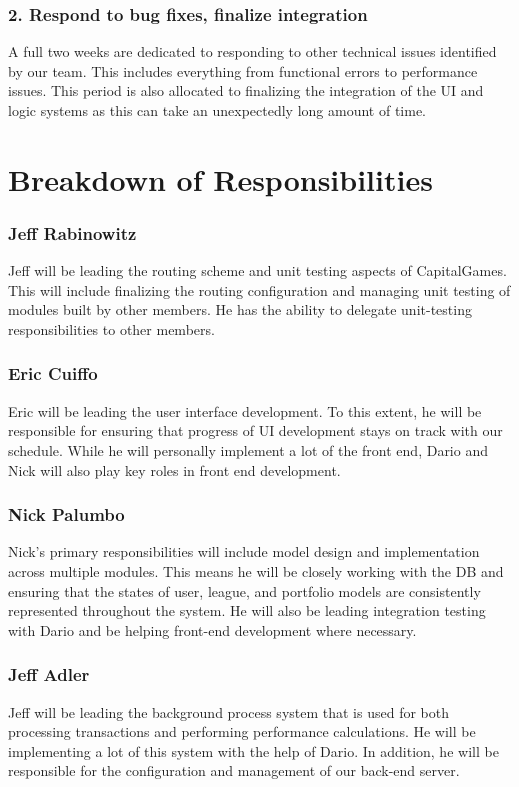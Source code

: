 \subsubsection{2. Respond to bug fixes, finalize integration}
A full two weeks are dedicated to responding to other technical issues identified by our team. This includes everything from functional errors to performance issues. This period is also allocated to finalizing the integration of the UI and logic systems as this can take an unexpectedly long amount of time. \\

\section{Breakdown of Responsibilities}
\subsubsection{Jeff Rabinowitz}
Jeff will be leading the routing scheme and unit testing aspects of CapitalGames. This will include finalizing the routing configuration and managing unit testing of modules built by other members. He has the ability to delegate unit-testing responsibilities to other members. \\
\subsubsection{Eric Cuiffo}
Eric will be leading the user interface development. To this extent, he will be responsible for ensuring that progress of UI development stays on track with our schedule. While he will personally implement a lot of the front end, Dario and Nick will also play key roles in front end development. \\
\subsubsection{Nick Palumbo}
Nick’s primary responsibilities will include model design and implementation across multiple modules. This means he will be closely working with the DB and ensuring that the states of user, league, and portfolio models are consistently represented throughout the system. He will also be leading integration testing with Dario and be helping front-end development where necessary. \\
\subsubsection{Jeff Adler}
Jeff will be leading the background process system that is used for both processing transactions and performing performance calculations. He will be implementing a lot of this system with the help of Dario. In addition, he will be responsible for the configuration and management of our back-end server.\\
